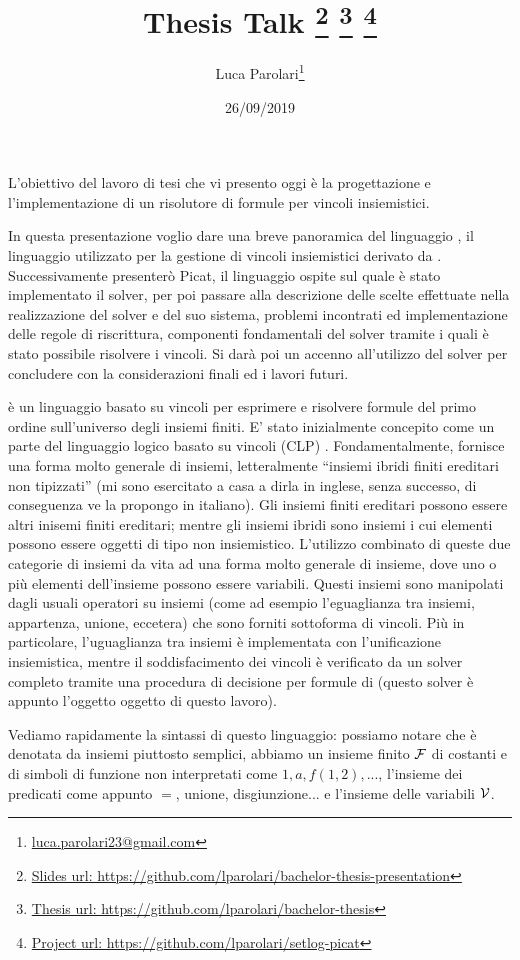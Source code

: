 \documentclass[11pt]{article}
\title{
	\textbf{Thesis Talk}
	\footnote{\href{https://github.com/lparolari/bachelor-thesis-presentation}{Slides url: https://github.com/lparolari/bachelor-thesis-presentation}}
	\footnote{\href{https://github.com/lparolari/bachelor-thesis}{Thesis url: https://github.com/lparolari/bachelor-thesis}}
	\footnote{\href{https://github.com/lparolari/setlog-picat}{Project url: https://github.com/lparolari/setlog-picat}}
}
\author{Luca Parolari\footnote{\href{mailto:luca.parolari23@gmail.com}{luca.parolari23@gmail.com}}}
\date{26/09/2019}
\begin{document}
\maketitle

L'obiettivo del lavoro di tesi che vi presento oggi è la progettazione
e l'implementazione di un risolutore di formule per vincoli
insiemistici.

In questa presentazione voglio dare una breve panoramica del
linguaggio \lset{}, il linguaggio utilizzato per la gestione di
vincoli insiemistici derivato da \clpset{}. Successivamente presenterò
Picat, il linguaggio ospite sul quale è stato implementato il solver,
per poi passare alla descrizione delle scelte effettuate nella
realizzazione del solver e del suo sistema, problemi incontrati ed
implementazione delle regole di riscrittura, componenti fondamentali
del solver tramite i quali è stato possibile risolvere i vincoli. Si
darà poi un accenno all'utilizzo del solver per concludere con la
considerazioni finali ed i lavori futuri.

\lset{} è un linguaggio basato su vincoli per esprimere e risolvere
formule del primo ordine sull'universo degli insiemi finiti. E' stato
inizialmente concepito come un parte del linguaggio logico basato su
vincoli (CLP) \clpset{}. Fondamentalmente, \lset{} fornisce una forma
molto generale di insiemi, letteralmente ``insiemi ibridi finiti
ereditari non tipizzati'' (mi sono esercitato a casa a dirla in
inglese, senza successo, di conseguenza ve la propongo in
italiano). Gli insiemi finiti ereditari possono essere altri inisemi
finiti ereditari; mentre gli insiemi ibridi sono insiemi i cui
elementi possono essere oggetti di tipo non insiemistico. L'utilizzo
combinato di queste due categorie di insiemi da vita ad una forma
molto generale di insieme, dove uno o più elementi dell'insieme
possono essere variabili. Questi insiemi sono manipolati dagli usuali
operatori su insiemi (come ad esempio l'eguaglianza tra insiemi,
appartenza, unione, eccetera) che sono forniti sottoforma di
vincoli. Più in particolare, l'uguaglianza tra insiemi è implementata
con l'unificazione insiemistica, mentre il soddisfacimento dei vincoli
è verificato da un solver completo tramite una procedura di decisione
per formule di \lset{} (questo solver è appunto l'oggetto oggetto di
questo lavoro).

Vediamo rapidamente la sintassi di questo linguaggio: possiamo notare
che è denotata da insiemi piuttosto semplici, abbiamo un insieme
finito $\mathcal{F}$ di costanti e di simboli di funzione non interpretati
come $1, a, f(1,2), ...$, l'insieme dei predicati come appunto $=$,
unione, disgiunzione... e l'insieme delle variabili $\mathcal{V}$.
\end{document}
